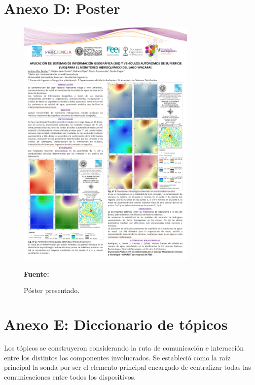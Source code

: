 \begin{appendices}
\chapter*{Anexo D: Poster}
\label{appendix: poster}
\begin{figure}[ht]
    \centering
    \includegraphics[width=0.78\textwidth]{Imagenes/cap5/poster-SIG-lago.png}
    \caption[Póster presentado en el V Encuentro de Investigadores 2020]{Póster presentado.}\textbf{Fuente:} \cite{noauthor_facultad_2020}
    \label{Fig:poster}
\end{figure}

\chapter*{Anexo E: Diccionario de t\'opicos}
\label{appendix: Topicos}
Los t\'opicos se construyeron considerando la ruta de comunicaci\'on e interacci\'on entre los distintos los componentes involucrados. Se estableci\'o como la ra\'iz principal la sonda por ser el elemento principal encargado de centralizar todas las comunicaciones entre todos los dispositivos.


\end{appendices}
